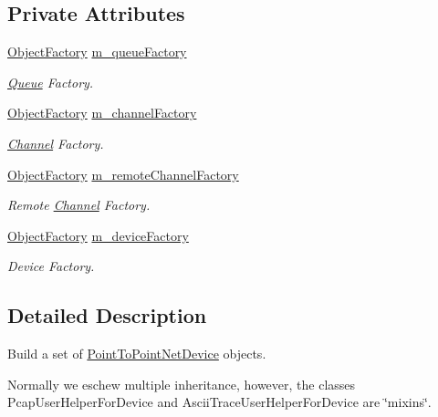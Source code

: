 \subsection*{Private Attributes}
\begin{DoxyCompactItemize}
\item 
\hyperlink{classns3_1_1ObjectFactory}{Object\+Factory} \hyperlink{classns3_1_1PointToPointHelper_a79d2da8ad9d40adc181d4c1b8520890f}{m\+\_\+queue\+Factory}
\begin{DoxyCompactList}\small\item\em \hyperlink{classns3_1_1Queue}{Queue} Factory. \end{DoxyCompactList}\item 
\hyperlink{classns3_1_1ObjectFactory}{Object\+Factory} \hyperlink{classns3_1_1PointToPointHelper_a1ba59f6f265fcda8868bd4d5891a1c72}{m\+\_\+channel\+Factory}
\begin{DoxyCompactList}\small\item\em \hyperlink{classns3_1_1Channel}{Channel} Factory. \end{DoxyCompactList}\item 
\hyperlink{classns3_1_1ObjectFactory}{Object\+Factory} \hyperlink{classns3_1_1PointToPointHelper_a96abd585304725f9ad2810503f795039}{m\+\_\+remote\+Channel\+Factory}
\begin{DoxyCompactList}\small\item\em Remote \hyperlink{classns3_1_1Channel}{Channel} Factory. \end{DoxyCompactList}\item 
\hyperlink{classns3_1_1ObjectFactory}{Object\+Factory} \hyperlink{classns3_1_1PointToPointHelper_ab70d3d643f30b809c90530d494a73eb4}{m\+\_\+device\+Factory}
\begin{DoxyCompactList}\small\item\em Device Factory. \end{DoxyCompactList}\end{DoxyCompactItemize}


\subsection{Detailed Description}
Build a set of \hyperlink{classns3_1_1PointToPointNetDevice}{Point\+To\+Point\+Net\+Device} objects. 

Normally we eschew multiple inheritance, however, the classes Pcap\+User\+Helper\+For\+Device and Ascii\+Trace\+User\+Helper\+For\+Device are \char`\"{}mixins\char`\"{}. 

